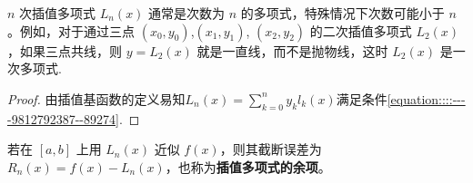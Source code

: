 \documentclass[../../main.tex]{subfiles}
\begin{document}
\begin{remark}
$n$ 次插值多项式 $L_n(x)$ 通常是次数为 $n$ 的多项式，特殊情况下次数可能小于 $n$。例如，对于通过三点 $(x_0, y_0)$,$ (x_1, y_1)$, $(x_2, y_2)$ 的二次插值多项式 $L_2(x)$，如果三点共线，则 $y = L_2(x)$ 就是一直线，而不是抛物线，这时 $L_2(x)$ 是一次多项式.
\end{remark}
\begin{proof}
由插值基函数的定义易知$L_n(x) = \sum_{k = 0}^n y_k l_k(x)$满足条件\eqref{equation::::----9812792387--89274}.

\end{proof}

\begin{definition}
若在 $[a, b]$ 上用 $L_n(x)$ 近似 $f(x)$，则其截断误差为 $R_n(x) = f(x) - L_n(x)$，也称为\textbf{插值多项式的余项}。
\end{definition}
\end{document}
